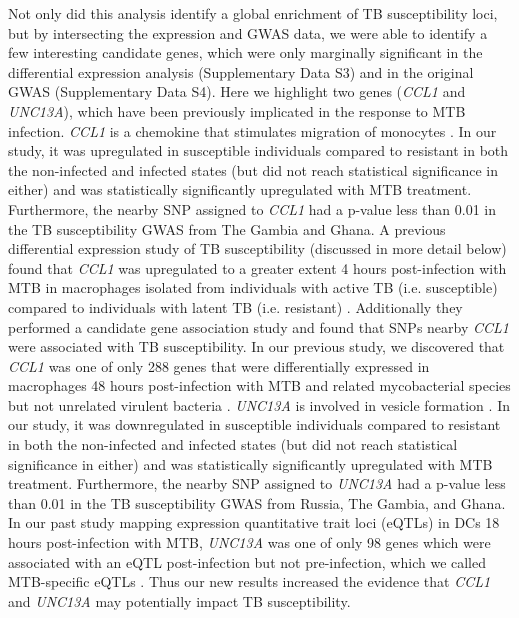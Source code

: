 \documentclass[fleqn,10pt]{wlscirep}
\begin{document}
Not only did this analysis identify a global enrichment of TB
susceptibility loci, but by intersecting the expression and GWAS data,
we were able to identify a few interesting candidate genes, which were
only marginally significant in the differential expression analysis
(Supplementary Data S3) and in the original GWAS (Supplementary Data
S4). Here we highlight two genes (\emph{CCL1} and \emph{UNC13A}),
which have been previously implicated in the response to MTB
infection. \emph{CCL1} is a chemokine that stimulates migration of
monocytes \cite{Miller1992}. In our study, it was upregulated in
susceptible individuals compared to resistant in both the non-infected
and infected states (but did not reach statistical significance in
either) and was statistically significantly upregulated with MTB
treatment. Furthermore, the nearby SNP assigned to \emph{CCL1} had a
p-value less than 0.01 in the TB susceptibility GWAS from The Gambia
and Ghana. A previous differential expression study of TB
susceptibility (discussed in more detail below) found that \emph{CCL1}
was upregulated to a greater extent 4 hours post-infection with MTB in
macrophages isolated from individuals with active TB (i.e.
susceptible) compared to individuals with latent TB (i.e. resistant)
\cite{Thuong2008}. Additionally they performed a candidate gene
association study and found that SNPs nearby \emph{CCL1} were
associated with TB susceptibility. In our previous study, we
discovered that \emph{CCL1} was one of only 288 genes that were
differentially expressed in macrophages 48 hours post-infection with
MTB and related mycobacterial species but not unrelated virulent
bacteria \cite{Blischak2015}. \emph{UNC13A} is involved in vesicle
formation \cite{Sudhof2004}. In our study, it was downregulated in
susceptible individuals compared to resistant in both the non-infected
and infected states (but did not reach statistical significance in
either) and was statistically significantly upregulated with MTB
treatment. Furthermore, the nearby SNP assigned to \emph{UNC13A} had a
p-value less than 0.01 in the TB susceptibility GWAS from Russia, The
Gambia, and Ghana. In our past study mapping expression quantitative
trait loci (eQTLs) in DCs 18 hours post-infection with MTB,
\emph{UNC13A} was one of only 98 genes which were associated with an
eQTL post-infection but not pre-infection, which we called
MTB-specific eQTLs \cite{Barreiro2012}. Thus our new results increased
the evidence that \emph{CCL1} and \emph{UNC13A} may potentially impact
TB susceptibility.
\end{document}
